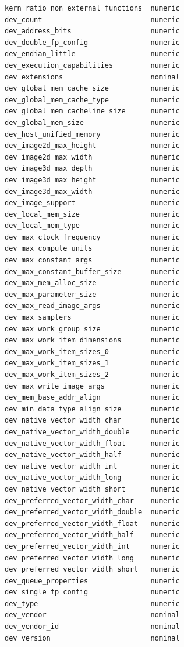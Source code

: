 \begin{appendices}
\begin{multicols}{2}
\begin{Verbatim}[fontsize=\footnotesize]
kern_ratio_non_external_functions  numeric
dev_count                          numeric
dev_address_bits                   numeric
dev_double_fp_config               numeric
dev_endian_little                  numeric
dev_execution_capabilities         numeric
dev_extensions                     nominal
dev_global_mem_cache_size          numeric
dev_global_mem_cache_type          numeric
dev_global_mem_cacheline_size      numeric
dev_global_mem_size                numeric
dev_host_unified_memory            numeric
dev_image2d_max_height             numeric
dev_image2d_max_width              numeric
dev_image3d_max_depth              numeric
dev_image3d_max_height             numeric
dev_image3d_max_width              numeric
dev_image_support                  numeric
dev_local_mem_size                 numeric
dev_local_mem_type                 numeric
dev_max_clock_frequency            numeric
dev_max_compute_units              numeric
dev_max_constant_args              numeric
dev_max_constant_buffer_size       numeric
dev_max_mem_alloc_size             numeric
dev_max_parameter_size             numeric
dev_max_read_image_args            numeric
dev_max_samplers                   numeric
dev_max_work_group_size            numeric
dev_max_work_item_dimensions       numeric
dev_max_work_item_sizes_0          numeric
dev_max_work_item_sizes_1          numeric
dev_max_work_item_sizes_2          numeric
dev_max_write_image_args           numeric
dev_mem_base_addr_align            numeric
dev_min_data_type_align_size       numeric
dev_native_vector_width_char       numeric
dev_native_vector_width_double     numeric
dev_native_vector_width_float      numeric
dev_native_vector_width_half       numeric
dev_native_vector_width_int        numeric
dev_native_vector_width_long       numeric
dev_native_vector_width_short      numeric
dev_preferred_vector_width_char    numeric
dev_preferred_vector_width_double  numeric
dev_preferred_vector_width_float   numeric
dev_preferred_vector_width_half    numeric
dev_preferred_vector_width_int     numeric
dev_preferred_vector_width_long    numeric
dev_preferred_vector_width_short   numeric
dev_queue_properties               numeric
dev_single_fp_config               numeric
dev_type                           numeric
dev_vendor                         nominal
dev_vendor_id                      nominal
dev_version                        nominal
\end{Verbatim}
\end{multicols}

\end{appendices}


